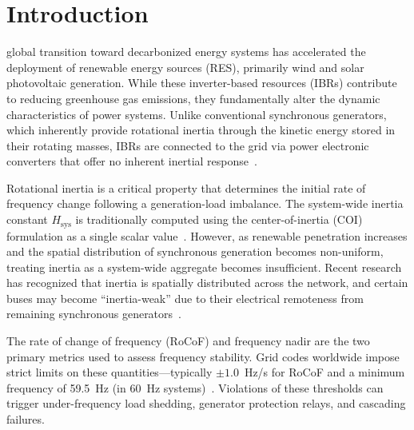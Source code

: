 \documentclass[]{ieeeaccess}
\begin{document}
\titlepgskip=-15pt

\maketitle

\section{Introduction}
\label{sec:introduction}

 global transition toward decarbonized energy systems has accelerated the deployment of renewable energy sources (RES), primarily wind and solar photovoltaic generation. While these inverter-based resources (IBRs) contribute to reducing greenhouse gas emissions, they fundamentally alter the dynamic characteristics of power systems. Unlike conventional synchronous generators, which inherently provide rotational inertia through the kinetic energy stored in their rotating masses, IBRs are connected to the grid via power electronic converters that offer no inherent inertial response~\cite{kundur1994,ulbig2014}.

Rotational inertia is a critical property that determines the initial rate of frequency change following a generation-load imbalance. The system-wide inertia constant $H_{\mathrm{sys}}$ is traditionally computed using the center-of-inertia (COI) formulation as a single scalar value~\cite{kundur1994}. However, as renewable penetration increases and the spatial distribution of synchronous generation becomes non-uniform, treating inertia as a system-wide aggregate becomes insufficient. Recent research has recognized that inertia is spatially distributed across the network, and certain buses may become ``inertia-weak'' due to their electrical remoteness from remaining synchronous generators~\cite{tuo2021,li2024}.

The rate of change of frequency (RoCoF) and frequency nadir are the two primary metrics used to assess frequency stability. Grid codes worldwide impose strict limits on these quantities---typically $\pm 1.0$~Hz/s for RoCoF and a minimum frequency of 59.5~Hz (in 60~Hz systems)~\cite{fernandez2019}. Violations of these thresholds can trigger under-frequency load shedding, generator protection relays, and cascading failures.
\end{document}
